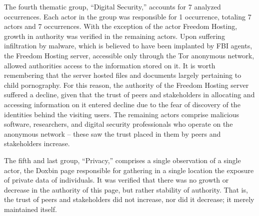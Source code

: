 The fourth thematic group, ``Digital Security,'' accounts for 7 analyzed occurrences. Each actor in the group was responsible for 1 occurrence, totaling 7 actors and 7 occurrences. With the exception of the actor Freedom Hosting, growth in authority was verified in the remaining actors. Upon suffering infiltration by malware, which is believed to have been implanted by FBI agents, the Freedom Hosting server, accessible only through the Tor anonymous network, allowed authorities access to the information stored on it. It is worth remembering that the server hosted files and documents largely pertaining to child pornography. For this reason, the authority of the Freedom Hosting server suffered a decline, given that the trust of peers and stakeholders in allocating and accessing information on it entered decline due to the fear of discovery of the identities behind the visiting users. The remaining actors comprise malicious software, researchers, and digital security professionals who operate on the anonymous network -- these saw the trust placed in them by peers and stakeholders increase.

The fifth and last group, ``Privacy,'' comprises a single observation of a single actor, the Doxbin page responsible for gathering in a single location the exposure of private data of individuals. It was verified that there was no growth or decrease in the authority of this page, but rather stability of authority. That is, the trust of peers and stakeholders did not increase, nor did it decrease; it merely maintained itself.

